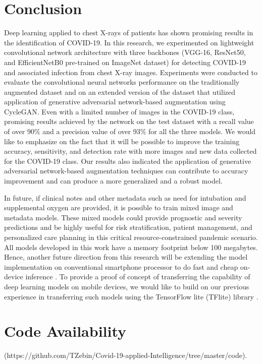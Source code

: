 \section{Conclusion}
\label{sec:conclusion}
 Deep learning applied to chest X-rays of patients has shown promising results in the identification of COVID-19. In this research, we experimented on lightweight convolutional network architecture with three backbones (VGG-16, ResNet50, and EfficientNetB0 pre-trained on ImageNet dataset) for detecting COVID-19 and associated infection from chest X-ray images. Experiments were conducted to evaluate the convolutional neural networks performance on the traditionally augmented dataset and on an extended version of the dataset that utilized application of generative adversarial network-based augmentation using CycleGAN.  Even with a limited number of images in the COVID-19 class, promising results achieved by the network on the test dataset with a recall value of over 90\% and a precision value of over 93\% for all the three models. We would like to emphasize on the fact that it will be possible to improve the training accuracy, sensitivity, and detection rate  with more images and new data collected for the COVID-19 class. Our results also indicated the application of generative adversarial network-based augmentation techniques can contribute to accuracy improvement and can produce a more generalized and a robust model.

In future, if clinical notes and other metadata such as need for intubation and supplemental oxygen are provided, it is possible to train mixed image and metadata models. These mixed models could provide prognostic and severity predictions \cite{cohen2020covid, wang2020covid} and be highly useful for risk stratification, patient management, and personalized care planning in this critical resource-constrained pandemic scenario.  All models developed in this work have a memory footprint below 100 megabytes. Hence, another future direction from this research will be extending the model implementation on conventional smartphone processor to do fast and cheap on-device inference  \cite{li2020covidmobilexpert}.  To provide a proof of concept of transferring the capability of deep learning models on mobile devices, we would like to build on our previous experience in transferring such models using the TensorFlow lite (TFlite) library \cite{tflite2019, zebin2019design}.


\section*{Code Availability}
(https://github.com/TZebin/Covid-19-applied-Intelligence/tree/master/code).


